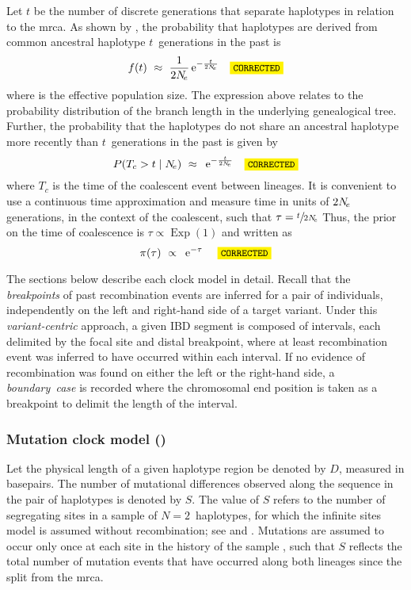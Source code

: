 Let $t$ be the number of discrete generations that separate  haplotypes in relation to the \gls{mrca}.
As shown by \citet{Tajima:1983bt}, the probability that  haplotypes are derived from  common ancestral haplotype $t$~generations in the past is
\begin{equation*}
	f(t) ~\approx~ \frac{1}{2\Ne} \euler{-\frac{t}{2\Ne}} \CorrectLabel
\end{equation*}
where \Ne is the effective population size.
The expression above relates to the probability distribution of the branch length in the underlying genealogical tree.
Further, the probability that the  haplotypes do not share an ancestral haplotype more recently than $t$~generations in the past is given by
\begin{equation*}
	P(T_c > t \mid \Ne) ~\approx~ \euler{-\frac{t}{2\Ne}} \CorrectLabel
\end{equation*}
where $T_c$ is the time of the coalescent event between  lineages.
It is convenient to use a continuous time approximation and measure time in units of ${2N_{\!e}}$ generations, in the context of the coalescent, such that ${\tau = \sfrac{t}{2N_{\!e}}}$
Thus, the prior on the time of coalescence is ${\tau \propto \operatorname{Exp}(1)}$ and written as
\begin{equation*}
	\pi(\tau) ~\propto~ \euler{-\tau}\ \CorrectLabel
\end{equation*}

The sections below describe each clock model in detail.
Recall that the \emph{breakpoints} of past recombination events are inferred for a pair of individuals, independently on the left and right-hand side of a target variant.
Under this \emph{variant-centric} approach, a given IBD segment is composed of  intervals, each delimited by the focal site and  distal breakpoint, where at least  recombination event was inferred to have occurred within each interval.
If no evidence of recombination was found on either the left or the right-hand side, a \emph{boundary~case} is recorded where the chromosomal end position is taken as a breakpoint to delimit the length of the interval.


%
\subsubsection{Mutation clock model (\ClockM)}
%

Let the physical length of a given haplotype region be denoted by $D$, measured in basepairs.
The number of mutational differences observed along the sequence in the pair of haplotypes is denoted by $S$.
The value of $S$ refers to the number of segregating sites in a sample of ${N=2}$~haplotypes, for which the infinite sites model is assumed without recombination; \eg see \citet{Watterson:1975ur} and \citet{Tavare:1997vra}.
Mutations are assumed to occur only once at each site in the history of the sample \citep{Kimura:1969tn}, such that $S$ reflects the total number of mutation events that have occurred along both lineages since the split from the \gls{mrca}.

